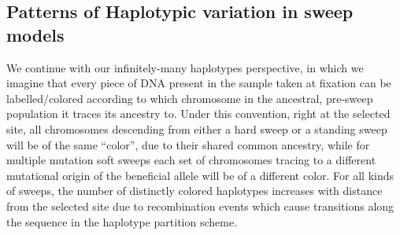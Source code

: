 \documentclass[a4paper,10pt]{article}
\newcommand{\jb}[1]{{\it\color{blue} (#1)} }
\begin{document}


\subsection{Patterns of Haplotypic variation in sweep models}

%

We continue with our infinitely-many haplotypes perspective, in which we imagine that every piece of DNA present in the sample taken at fixation can be labelled/colored according to which chromosome in the ancestral, pre-sweep population it traces its ancestry to. Under this convention, right at the selected site, all chromosomes descending from either a hard sweep or a standing sweep will be of the same ``color'', due to their shared common ancestry, while for multiple mutation soft sweeps each set of chromosomes tracing to a different mutational origin of the beneficial allele will be of a different color. For all kinds of sweeps, the number of distinctly colored haplotypes increases with distance from the selected site due to recombination events which cause transitions along the sequence in the haplotype partition scheme.
\end{document}
